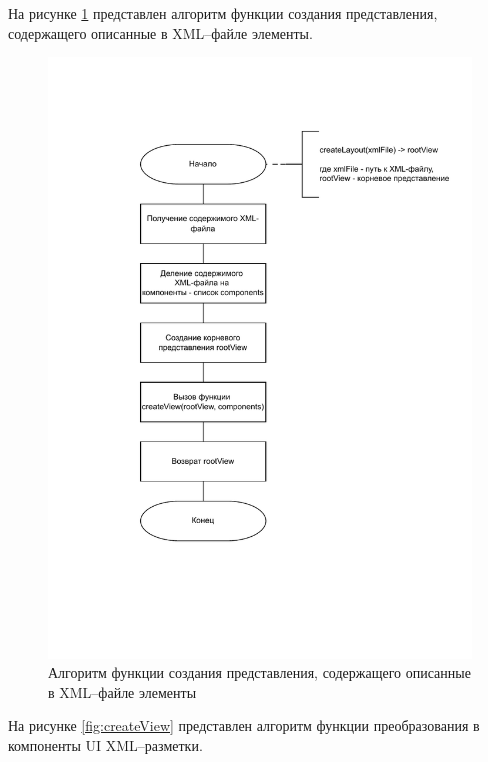 \clearpage
На рисунке \ref{fig:createLayout} представлен алгоритм функции создания представления, содержащего описанные в XML--файле элементы.
\begin{figure}[!htb]
	\centering
	\includegraphics[scale=0.92]{img/createLayout.pdf}
	\caption{Алгоритм функции создания представления, содержащего описанные в XML--файле элементы}
	\label{fig:createLayout}
\end{figure}
\clearpage
На рисунке \ref{fig:createView} представлен алгоритм функции преобразования в компоненты UI XML--разметки.
